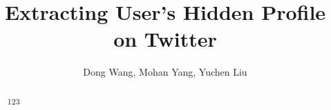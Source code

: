 \documentclass{sig-alternate}
\title{Extracting User's Hidden Profile on Twitter}
\author{Dong Wang, Mohan Yang, Yuchen Liu}
\begin{document}
\maketitle

\begin{abstract}
123
\end{abstract}









{ }
\end{document}
